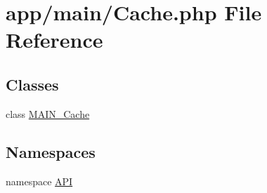 \hypertarget{Cache_8php}{
\section{app/main/Cache.php File Reference}
\label{d5/d6c/Cache_8php}
}
\subsection*{Classes}
\begin{DoxyCompactItemize}
\item 
class \hyperlink{classMAIN__Cache}{MAIN\_\-Cache}
\end{DoxyCompactItemize}
\subsection*{Namespaces}
\begin{DoxyCompactItemize}
\item 
namespace \hyperlink{namespaceAPI}{API}
\end{DoxyCompactItemize}
